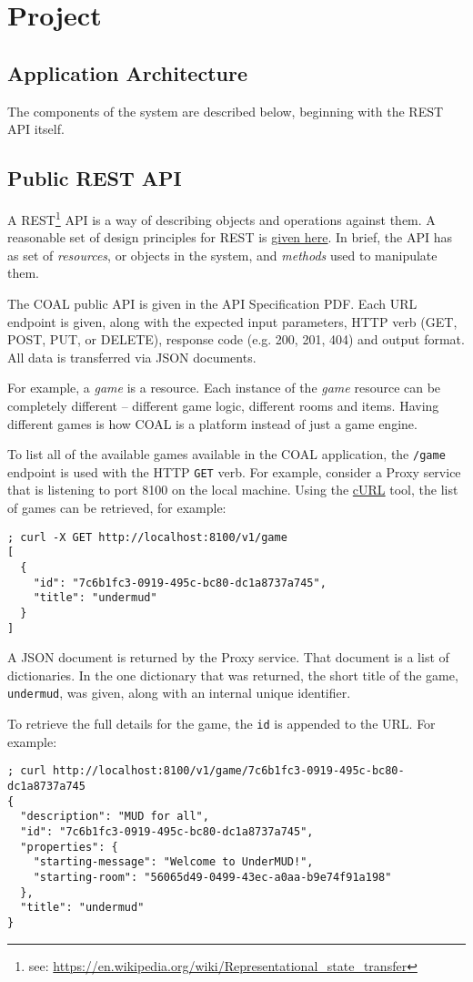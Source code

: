 \documentclass{article}
\newcommand{\enterProblemHeader}[1]{
}
\newcommand{\exitProblemHeader}[1]{
\nobreak\extramarks{#1}{}\nobreak
}
\newcounter{homeworkProblemCounter} %
\newcommand{\homeworkProblemName}{}
\newenvironment{homeworkProblem}[1][Problem \arabic{homeworkProblemCounter}]{ %
\stepcounter{homeworkProblemCounter} %
\renewcommand{\homeworkProblemName}{#1} %
\section{\homeworkProblemName} %
\enterProblemHeader{\homeworkProblemName} %
}{
\exitProblemHeader{\homeworkProblemName} %
}
\newcommand{\homeworkSectionName}{}
\newenvironment{homeworkSection}[1]{ %
\renewcommand{\homeworkSectionName}{#1} %
\subsection{\homeworkSectionName} %
\enterProblemHeader{\homeworkProblemName\ [\homeworkSectionName]} %
}{
\enterProblemHeader{\homeworkProblemName} %
}
\begin{document}
\begin{homeworkProblem}[Project]
\begin{homeworkSection}{Application Architecture}
The components of the system are described below, beginning with the REST API itself.
\end{homeworkSection}


\begin{homeworkSection}{Public REST API}
	A REST\footnote{see: \url{https://en.wikipedia.org/wiki/Representational_state_transfer}} API is a way of describing objects and operations against them. A reasonable set of design principles for REST is \href{https://restfulapi.net/}{given here}. In brief, the API has as set of \textit{resources}, or objects in the system, and \textit{methods} used to manipulate them.

	The COAL public API is given in the API Specification PDF. Each URL endpoint is given, along with the expected input parameters, HTTP verb (GET, POST, PUT, or DELETE),  response code (e.g. 200, 201, 404) and output format. All data is transferred via JSON documents.

	For example, a \textit{game} is a resource. Each instance of the \textit{game} resource can be completely different -- different game logic, different rooms and items. Having different games is how COAL is a platform instead of just a game engine.

	To list all of the available games available in the COAL application, the \texttt{/game} endpoint is used with the HTTP \texttt{GET} verb. For example, consider a Proxy service that is listening to port 8100 on the local machine. Using the \href{https://curl.se/}{cURL} tool, the list of games can be retrieved, for example:

\begin{Verbatim}[fontsize=\small]
; curl -X GET http://localhost:8100/v1/game
[
  {
    "id": "7c6b1fc3-0919-495c-bc80-dc1a8737a745",
    "title": "undermud"
  }
]
\end{Verbatim}

	A JSON document is returned by the Proxy service. That document is a list of dictionaries. In the one dictionary that was returned, the short title of the game, \texttt{undermud}, was given, along with an internal unique identifier.

	To retrieve the full details for the game, the \texttt{id} is appended to the URL. For example:

\begin{Verbatim}[fontsize=\small]
; curl http://localhost:8100/v1/game/7c6b1fc3-0919-495c-bc80-dc1a8737a745
{
  "description": "MUD for all",
  "id": "7c6b1fc3-0919-495c-bc80-dc1a8737a745",
  "properties": {
    "starting-message": "Welcome to UnderMUD!",
    "starting-room": "56065d49-0499-43ec-a0aa-b9e74f91a198"
  },
  "title": "undermud"
}
\end{Verbatim}	


\end{homeworkSection}
\end{homeworkProblem}
\end{document}
